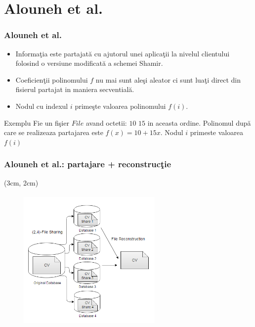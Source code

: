 \documentclass{beamer}
\begin{document}
\section{Alouneh et al.}
\begin{frame}
    \frametitle{Alouneh et al.}
    \begin{itemize}
        \item Informa\c{t}ia este partajat\u{a} cu ajutorul unei aplica\c{t}ii la nivelul clientului folosind o versiune modificat\u{a} a schemei Shamir.
        \pause
        \item Coeficien\c{t}ii polinomului $f$ nu mai sunt ale\c{s}i aleator ci sunt lua\c{t}i direct din fisierul partajat in maniera secvential\u{a}.
        \pause
        \item Nodul cu indexul $i$ prime\c{s}te valoarea polinomului $f(i)$.
    \end{itemize} 
    \pause
    \begin{exampleblock}{Exemplu}
        Fie un fi\c{s}ier $File$ avand octetii: $10$ $15$ in aceasta ordine.
        Polinomul dup\u{a} care se realizeaza partajarea este $f(x) = 10 + 15x$.
        Nodul $i$ primeste valoarea $f(i)$
    \end{exampleblock}
\end{frame}
\begin{frame}
    \frametitle{Alouneh et al.: partajare + reconstruc\c{t}ie}
     \begin{textblock*}{4cm}(3cm, 2cm)
        \begin{figure}
            \includegraphics[width=7cm,height=7cm,keepaspectratio]{img/results/sharing.png}
       \end{figure}
    \end{textblock*}
\end{frame}
\end{document}
